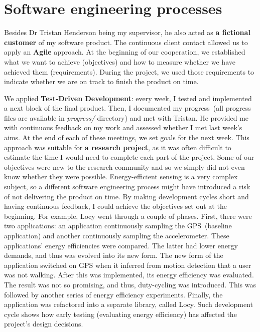 \section{Software engineering processes}
\label{s:processes}
\hspace{10pt} Besides Dr Tristan Henderson being my supervisor, he also acted as \textbf{a fictional customer} of my software product. The continuous client contact allowed us to apply an \textbf{Agile} approach. At the beginning of our cooperation, we established what we want to achieve (objectives) and how to measure whether we have achieved them (requirements). During the project, we used those requirements to indicate whether we are on track to finish the product on time.

We applied \textbf{Test-Driven Development}: every week, I tested and implemented a next block of the final product. Then, I documented my progress\ (all progress files are available in \textit{progress/} directory) and met with Tristan. He provided me with continuous feedback on my work and assessed whether I met last week's aims. At the end of each of these meetings, we set goals for the next week. This approach was suitable for \textbf{a research project}, as it was often difficult to estimate the time I would need to complete each part of the project. Some of our objectives were new to the research community and so we simply did not even know whether they were possible. Energy-efficient sensing is a very complex subject, so a different software engineering process might have introduced a risk of not delivering the product on time. By making development cycles short and having continuous feedback, I could achieve the objectives set out at the beginning. For example, Locy went through a couple of phases. First, there were two applications: an application continuously sampling the GPS\ (baseline application) and another continuously sampling the accelerometer. These applications' energy efficiencies were compared. The latter had lower energy demands, and thus was evolved into its new form. The new form of the application switched on GPS when it inferred from motion detection that a user was not walking. After this was implemented, its energy efficiency was evaluated. The result was not so promising, and thus, duty-cycling was introduced. This was followed by another series of energy efficiency experiments. Finally, the application was refactored into a separate library, called Locy. Such development cycle shows how early testing (evaluating energy efficiency) has affected the project's design decisions.
			
